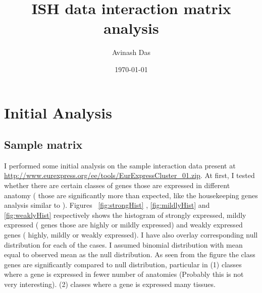 \documentclass{article}
\title{
ISH data interaction matrix analysis
}
\author{Avinash Das}
\date{\today}
\begin{document}
\pagestyle{fancy}

\maketitle

\section{Initial Analysis}
\subsection{Sample matrix}
I performed some initial analysis on the sample interaction data present at \url{http://www.eurexpress.org/ee/tools/EurExpressCluster_01.zip}.
At first, I tested whether there are certain classes of genes those are expressed in different anatomy ( those are significantly more than expected, like the housekeeping genes analysis similar to \cite{eisenberg2003human}). Figures ~\ref{fig:strongHist} , \ref{fig:mildlyHist} and \ref{fig:weaklyHist} respectively shows the histogram of strongly expressed, mildly expressed ( genes those are highly or mildly expressed) and weakly expressed genes ( highly, mildly or weakly expressed).  
I have also overlay corresponding null distribution for each of the cases. I assumed binomial distribution with mean equal to observed mean as the null distribution. 
As seen from the figure the class genes are significantly compared to null distribution, particular in (1) classes where a gene is expressed in fewer number of anatomies (Probably this is not very interesting). (2) classes where a gene is expressed many tissues. 
\end{document}
